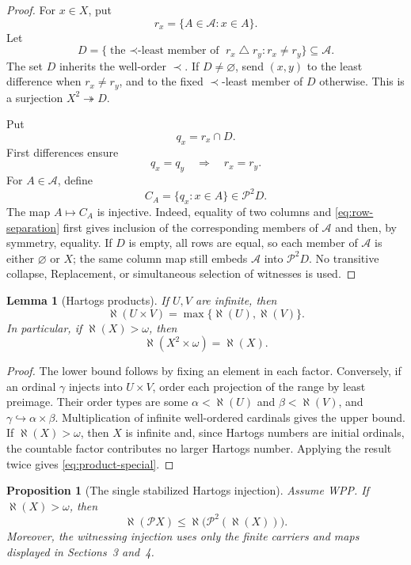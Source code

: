 \documentclass[11pt]{article}
\newtheorem{proposition}[theorem]{Proposition}
\newtheorem{lemma}[theorem]{Lemma}
\numberwithin{equation}{section}
\theoremstyle{definition}
\theoremstyle{remark}
\newcommand{\Pow}{\mathcal P}
\newcommand{\inj}{\hookrightarrow}
\newcommand{\surj}{\twoheadrightarrow}
\begin{document}
\begin{proof}
For $x\in X$, put
\[
 r_x=\{A\in\mathcal A:x\in A\}.
\]
Let
\[
 D=\{\text{the $\prec$-least member of }
       r_x\mathbin\triangle r_y: r_x\neq r_y\}
 \subseteq\mathcal A.
\]
The set $D$ inherits the well-order $\prec$.  If $D\neq\varnothing$,
send $(x,y)$ to the least difference when $r_x\neq r_y$, and to the
fixed $\prec$-least member of $D$ otherwise.  This is a surjection
$X^2\surj D$.

Put
\[
 q_x=r_x\cap D.
\]
First differences ensure
\begin{equation}
 q_x=q_y\quad\Longrightarrow\quad r_x=r_y.
 \label{eq:row-separation}
\end{equation}
For $A\in\mathcal A$, define
\[
 C_A=\{q_x:x\in A\}\in\Pow^2D.
\]
The map $A\mapsto C_A$ is injective.  Indeed, equality of two columns and
\eqref{eq:row-separation} first gives inclusion of the corresponding
members of $\mathcal A$ and then, by symmetry, equality.  If $D$ is
empty, all rows are equal, so each member of $\mathcal A$ is either
$\varnothing$ or $X$; the same column map still embeds $\mathcal A$ into
$\Pow^2D$.  No transitive collapse, Replacement, or simultaneous
selection of witnesses is used.
\end{proof}

\begin{lemma}[Hartogs products]\label{lem:products}
If $U,V$ are infinite, then
\[
 \aleph(U\times V)=\max\{\aleph(U),\aleph(V)\}.
\]
In particular, if $\aleph(X)>\omega$, then
\begin{equation}
 \aleph(X^2\times\omega)=\aleph(X).
 \label{eq:product-special}
\end{equation}
\end{lemma}

\begin{proof}
The lower bound follows by fixing an element in each factor.  Conversely,
if an ordinal $\gamma$ injects into $U\times V$, order each projection
of the range by least preimage.  Their order types are some
\(\alpha<\aleph(U)\) and $\beta<\aleph(V)$, and
\(\gamma\inj\alpha\times\beta\).  Multiplication of infinite
well-ordered cardinals gives the upper bound.  If
$\aleph(X)>\omega$, then $X$ is infinite and, since Hartogs numbers are
initial ordinals, the countable factor contributes no larger Hartogs
number.  Applying the result twice gives \eqref{eq:product-special}.
\end{proof}

\begin{proposition}[The single stabilized Hartogs injection]
\label{prop:stabilized}
Assume WPP.  If $\aleph(X)>\omega$, then
\begin{equation}
 \aleph(\Pow X)
 \leq
 \aleph\bigl(\Pow^2(\aleph(X))\bigr).
 \label{eq:stabilized}
\end{equation}
Moreover, the witnessing injection uses only the finite carriers and maps
displayed in Sections~3 and~4.
\end{proposition}
\end{document}
